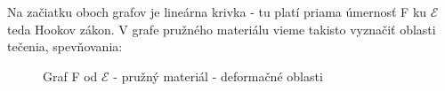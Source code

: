 \documentclass[11pt]{extarticle}
\newcommand{\Epsilon}{\mathcal{E}}
\begin{document}
Na začiatku oboch grafov je lineárna krivka - tu platí priama úmernosť F ku $\Epsilon$ teda Hookov zákon. V grafe pružného materiálu vieme takisto vyznačiť oblasti tečenia, spevňovania:\\

\begin{figure}[H]
	\centering
	\caption{Graf F od $\Epsilon$ - pružný materiál - deformačné oblasti}
\end{figure}
\end{document}
